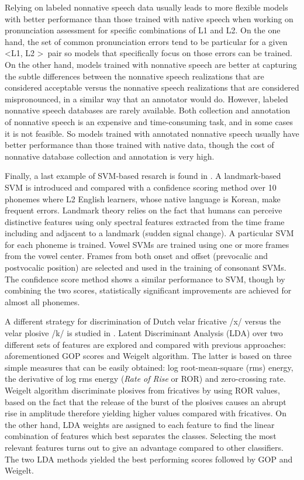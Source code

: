 Relying on labeled nonnative speech data usually leads to more flexible models 
with better performance than those trained with native speech
when working on pronunciation assessment for specific combinations of L1 and L2. On the one hand,
the set of common pronunciation errors tend to be particular for a given \textless L1, L2 \textgreater \ pair so 
models that specifically focus on those errors can be trained. On the other hand, models trained
with nonnative speech are better at capturing the subtle differences between the nonnative
speech realizations that are considered acceptable versus the nonnative speech realizations
that are considered mispronounced, in a similar way that an annotator would do. 
However, labeled nonnative speech databases are rarely available. Both collection and annotation 
of nonnative speech is an expensive and time-consuming task, and in some cases it is not feasible.
So models trained with annotated nonnative speech usually have better performance
than those trained with native data, though the cost of nonnative database 
collection and annotation is very high.

Finally, a last example of SVM-based resarch is found in \cite{landmark_svm, landmark_svm_2}. 
A landmark-based SVM is introduced and compared with a confidence 
scoring method over 10 phonemes where 
L2 English learners, whose native language is Korean, make frequent errors. 
Landmark theory relies on the fact that humans can perceive distinctive
features using only spectral features extracted from the time frame including and adjacent to
a landmark (sudden signal change). A particular SVM for each phoneme is trained. Vowel SVMs are 
trained using one or more frames from the vowel center. Frames from both onset and offset
(prevocalic and postvocalic position) are selected and used in the training of consonant
SVMs. The confidence score method shows a similar performance to SVM, though by combining 
the two scores, statistically significant improvements are achieved for almost all phonemes.

A different strategy for discrimination of Dutch velar fricative /x/ versus the velar plosive
/k/ is studied in \cite{lda_weigelt}. Latent Discriminant Analysis (LDA) over two different sets
of features are explored and compared with previous approaches: aforementioned GOP scores and
Weigelt algorithm. The latter is based on three simple measures that can be easily obtained:
log root-mean-square (rms) energy, the derivative of log rms energy (\textit{Rate of Rise} or
ROR) and zero-crossing rate. Weigelt algorithm discriminate plosives from fricatives by using
ROR values, based on the fact that the release of the burst of the plosives causes an abrupt
rise in amplitude therefore yielding higher values compared with fricatives.
On the other hand, LDA weights are assigned to each feature to 
find the linear combination of features
which best separates the classes. Selecting the most relevant features turns out to give an
advantage compared to other classifiers. The two LDA methods yielded the best performing
scores followed by GOP and Weigelt.

